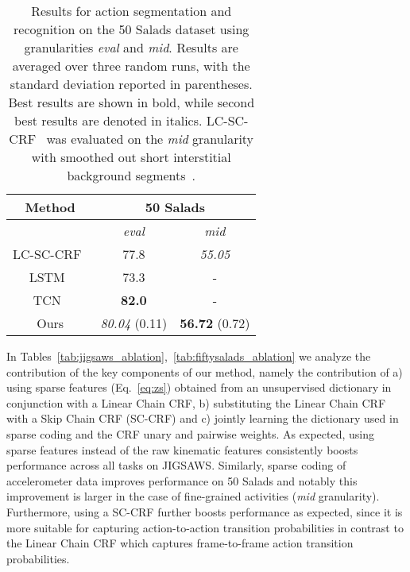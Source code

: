 \documentclass[10pt,twocolumn,letterpaper]{article}
\begin{document}
\begin{table}[t]
\centering
\begin{tabular}{|@{\,}c@{\,}|@{\,}c@{\,}|@{\,}c@{\,}|}
\hline
Method & \multicolumn{2}{c|}{50 Salads} \\
\hline
 & \emph{eval} & \emph{mid} \\
\hline

LC-SC-CRF~\cite{Lea:ICRA16} & 77.8 & \emph{55.05}\text{*} \\
LSTM~\cite{Lea:ECCV16-WBNIMR} & 73.3 & - \\
TCN~\cite{Lea:ECCV16-WBNIMR} & \textbf{82.0} & - \\
Ours & \emph{80.04} (0.11) & \textbf{56.72} (0.72) \\
\hline 
\end{tabular}
\caption{Results for action segmentation and recognition on the 50 Salads dataset using granularities \emph{eval} and \emph{mid}. Results are averaged over three random runs, with the standard deviation reported in parentheses. Best results are shown in bold, while second best results are denoted in italics.\text{*} LC-SC-CRF~\cite{Lea:ICRA16} was evaluated on the \emph{mid} granularity with smoothed out short interstitial background segments~\cite{Lea:ECCV16-WBNIMR}. 
}
\vspace{-1.5em}
\label{tab:fiftysalads_sota}
\end{table}

In Tables~\ref{tab:jigsaws_ablation},~\ref{tab:fiftysalads_ablation} we analyze the contribution of the key components of our method, namely the contribution of
a) using sparse features (Eq.~\ref{eq:zs}) obtained from an unsupervised dictionary in conjunction with a Linear Chain CRF, b) substituting the Linear Chain CRF with a Skip Chain CRF (SC-CRF) and c) jointly learning the dictionary used in sparse coding and the CRF unary and pairwise weights. As expected, using sparse features instead of the raw kinematic features consistently boosts performance across all tasks on JIGSAWS. Similarly, sparse coding of accelerometer data improves performance on 50 Salads and notably this improvement is larger in the case of fine-grained activities (\emph{mid} granularity). Furthermore, using a SC-CRF further boosts performance as expected, since it is more suitable for capturing action-to-action transition probabilities in contrast to the Linear Chain CRF which captures frame-to-frame action transition probabilities. 
\end{document}
